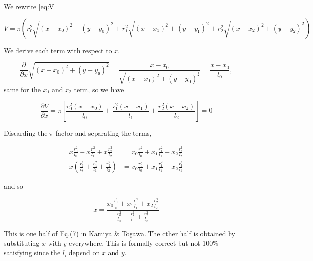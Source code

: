 \documentclass[a4paper, 11pt]{article} %
\newcommand{\sqlen}[1]{\ensuremath{(x - x_{#1})^2 + (y-y_{#1})^2}}
\newcommand{\rili}[1]{\ensuremath{\frac{r_{#1}^2}{l_{#1}}}}
\begin{document}
\begin{appendix}
We rewrite \eqref{eq:V}

\begin{equation*}
V = \pi(r_0^2 \sqrt{\sqlen{0}} + r_1^2 \sqrt{\sqlen{1}} + r_2^2 \sqrt{\sqlen{2}})
\end{equation*}

We derive each term with respect to $x$.

\begin{equation*}
\frac{\partial}{\partial x} \sqrt{\sqlen{0}} = \frac{x-x_0}{\sqrt{\sqlen{0}}} = \frac{x-x_0}{l_0},
\end{equation*}
same for the $x_1$ and $x_2$ term, so we have

\begin{equation*}
\frac{\partial V}{\partial x} = \pi\left[ \frac{r_0^2(x-x_0)}{l_0} + \frac{r_1^2(x-x_1)}{l_1} + \frac{r_2^2(x-x_2)}{l_2}\right] = 0
\end{equation*}

Discarding the $\pi$ factor and separating the terms,

\begin{align*}
x\rili{0} + x\rili{1} + x\rili{2} &= x_0\rili{0} + x_1\rili{1} + x_2\rili{2} \\
x(\rili{0} + \rili{1} + \rili{2}) &= x_0\rili{0} + x_1\rili{1} + x_2\rili{2} 
\end{align*}

and so

\begin{equation*}
x = \frac{x_0\rili{0} + x_1\rili{1} + x_2\rili{2}}{\rili{0} + \rili{1} + \rili{2}}
\end{equation*}

This is one half of Eq.(7) in Kamiya \& Togawa. The other half is obtained by substituting $x$ with $y$ everywhere. This is
formally correct but not 100\% satisfying since the $l_i$ depend on $x$ and $y$.

\end{appendix}






\end{document}

